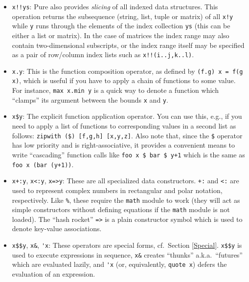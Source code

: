 \documentclass[a4paper,12pt]{article}
\begin{document}
\begin{itemize}
\item \verb|x!!ys|: Pure also provides \emph{slicing} of all indexed data structures. This operation returns the subsequence (string, list, tuple or matrix) of all \verb|x!y| while \verb|y| runs through the elements of the index collection \verb|ys| (this can be either a list or matrix). In the case of matrices the index range may also contain two-dimensional subscripts, or the index range itself may be specified as a pair of row/column index lists such as \lstinline{x!!(i..j,k..l)}.

\item \verb|x.y|: This is the function composition operator, as defined by \lstinline{(f.g) x = f(g x)}, which is useful if you have to apply a chain of functions to some value. For instance, \lstinline{max x.min y} is a quick way to denote a function which ``clamps'' its argument between the bounds \verb|x| and \verb|y|.

\item \verb|x$y|: The explicit function application operator. You can use this, e.g., if you need to apply a list of functions to corresponding values in a second list as follows: \lstinline{zipwith ($) [f,g,h] [x,y,z]}. Also note that, since the \verb|$| operator has low priority and is right-associative, it provides a convenient means to write ``cascading'' function calls like \lstinline{foo x $ bar $ y+1} which is the same as \lstinline{foo x (bar (y+1))}.

\item \verb|x+:y|, \verb|x<:y|, \verb|x=>y|: These are all specialized data constructors. \verb|+:| and \verb|<:| are used to represent complex numbers in rectangular and polar notation, respectively. Like \verb|%|, these require the \verb|math| module to work (they will act as simple constructors without defining equations if the \verb|math| module is not loaded). The ``hash rocket'' \verb|=>| is a plain constructor symbol which is used to denote key-value associations.

\item \verb|x$$y|, \verb|x&|, \verb|'x|: These operators are special forms, cf.\ Section \ref{Special}. \verb|x$$y| is used to execute expressions in sequence, \verb|x&| creates ``thunks'' a.k.a.\ ``futures'' which are evaluated lazily, and \verb|'x| (or, equivalently, \verb|quote x|) defers the evaluation of an expression.
\end{itemize}
\end{document}
